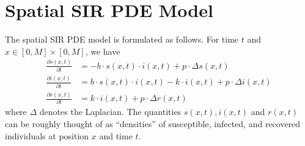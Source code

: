 \documentclass[12pt, reqno]{amsart}
\begin{document}
    \section{Spatial SIR PDE Model}\label{appendix:sir_pde}
    The spatial SIR PDE model is formulated as follows. For time \(t\) and \(x \in [0, M] \times [0, M]\), we have
    \begin{align*}
        \frac{\partial s(x,t)}{\partial t} &= -b \cdot s(x, t) \cdot i(x, t) + p \cdot \Delta s(x, t) \\
        \frac{\partial i(x, t)}{\partial t} &= b \cdot s(x, t) \cdot i(x, t) - k \cdot i(x, t) + p \cdot \Delta i(x, t) \\
        \frac{\partial r(x, t)}{\partial t} &= k \cdot i(x, t) + p \cdot \Delta r(x, t)
    \end{align*}
    where \(\Delta\) denotes the Laplacian. The quantities \(s(x, t), i(x, t)\) and \(r(x, t)\) can be roughly thought of as ``densities'' of susceptible, infected, and recovered individuals at position \(x\) and time \(t\). 
\end{document}

